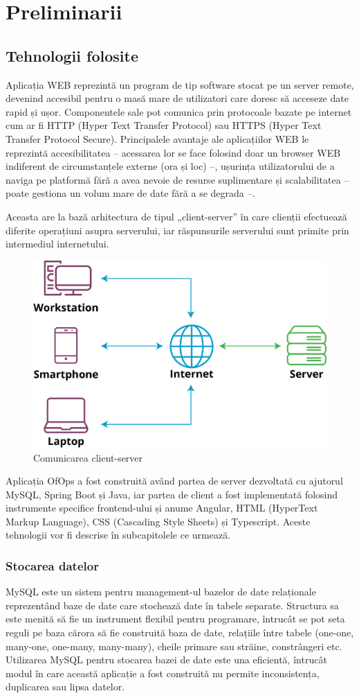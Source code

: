 \chapter{Preliminarii}

\section{Tehnologii folosite}
Aplicația WEB reprezintă un program de tip software stocat pe un server remote, devenind accesibil pentru o masă mare de utilizatori care doresc să acceseze date rapid și ușor. Componentele sale pot  comunica prin protocoale bazate pe internet cum ar fi HTTP (Hyper Text Transfer Protocol) sau HTTPS (Hyper Text Transfer Protocol Secure).\cite{citation1}  Principalele avantaje ale aplicațiilor WEB le reprezintă accesibilitatea – acessarea lor se face folosind doar un browser WEB indiferent de circumstanțele externe (ora și loc) –, ușurința utilizatorului de a naviga pe platformă fără a avea nevoie de resurse suplimentare și scalabilitatea – poate gestiona un volum mare de date fără a se degrada –.

Aceasta are la bază arhitectura de tipul „client-server” în care clienții efectuează diferite operațiuni asupra serverului, iar răspunsurile serverului sunt primite prin intermediul internetului. 

\begin{figure}[!htb]
    \centering
    \includegraphics[width=0.45\linewidth]{images/client-server-network.png}
    \caption{Comunicarea client-server}
    \label{fig:client-server}
\end{figure}

\newpage
Aplicația OfOps a fost construită având partea de server dezvoltată cu ajutorul MySQL, Spring Boot și Java, iar partea de client a fost implementată folosind instrumente specifice frontend-ului și anume Angular, HTML (HyperText Markup Language), CSS (Cascading Style Sheets) și Typescript. Aceste tehnologii vor fi descrise în subcapitolele ce urmează. 

\subsection{Stocarea datelor}
MySQL este un sistem pentru management-ul bazelor de date relaționale reprezentând baze de date care stochează date în tabele separate.\cite{citation2} Structura sa este menită să fie un instrument flexibil pentru programare, întrucât se pot seta reguli pe baza cărora să fie construită baza de date, relațiile între tabele (one-one, many-one, one-many, many-many), cheile primare sau străine, constrângeri etc. Utilizarea MySQL pentru stocarea bazei de date este una eficientă, întrucât modul în care această aplicație a fost construită nu permite inconsistența, duplicarea sau lipsa datelor.

